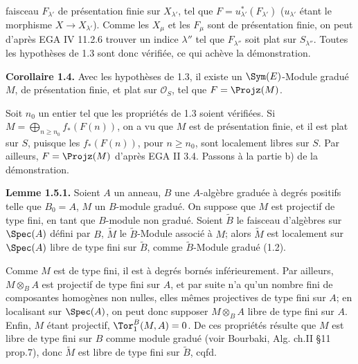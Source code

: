 faisceau \(F_{\lambda'}\) de présentation finie sur \(X_{\lambda'}\), tel que \(F=u_{\lambda'}^*(F_{\lambda'})\) (\(u_{\lambda'}\) étant le morphisme \(X\to X_{\lambda'}\)). Comme les \(X_\mu\) et les \(F_\mu\) sont de présentation finie, on peut d'après EGA IV 11.2.6 trouver un indice \(\lambda''\) tel que \(F_{\lambda''}\) soit plat sur \(S_{\lambda''}\). Toutes les hypothèses de 1.3 sont donc vérifiée, ce qui achève la démonstration.

\textbf{Corollaire 1.4.} Avec les hypothèses de 1.3, il existe un \(\Sym(E)\)-Module gradué \(M\), de présentation finie, et plat sur \(\mathcal O_S\), tel que \(F=\Projz(M)\).

Soit \(n_0\) un entier tel que les propriétés de 1.3 soient vérifiées. Si \(M=\bigoplus_{n\geq n_0} f_*(F(n))\), on a vu que \(M\) est de présentation finie, et il est plat sur \(S\), puisque les \(f_*(F(n))\), pour \(n\geq n_0\), sont localement libres sur \(S\). Par ailleurs, \(F=\Projz(M)\) d'après EGA II 3.4. Passons à la partie b) de la démonstration.

\textbf{Lemme 1.5.1.} Soient \(A\) un anneau, \(B\) une \(A\)-algèbre graduée à degrés positifs telle que \(B_0=A\), \(M\) un \(B\)-module gradué. On suppose que \(M\) est projectif de type fini, en tant que \(B\)-module non gradué. Soient \(\widetilde B\) le faisceau d'algèbres sur \(\Spec(A)\) défini par \(B\), \(\widetilde M\) le \(\widetilde B\)-Module associé à \(M\); alors \(\widetilde M\) est localement sur \(\Spec(A)\) libre de type fini sur \(\widetilde B\), comme \(\widetilde B\)-Module gradué (1.2).

Comme \(M\) est de type fini, il est à degrés bornés inférieurement. Par ailleurs, \(M\otimes_B A\) est projectif de type fini sur \(A\), et par suite n'a qu'un nombre fini de composantes homogènes non nulles, elles mêmes projectives de type fini sur \(A\); en localisant sur \(\Spec(A)\), on peut donc supposer \(M\otimes_B A\) libre de type fini sur \(A\). Enfin, \(M\) étant projectif, \(\Tor_1^B(M,A)=0\). De ces propriétés résulte que \(M\) est libre de type fini sur \(B\) comme module gradué (voir Bourbaki, Alg. ch.II §11 prop.7), donc \(\widetilde M\) est libre de type fini sur \(\widetilde B\), cqfd.

